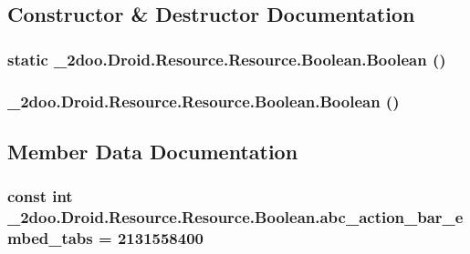 \subsection{Constructor \& Destructor Documentation}
\hypertarget{class__2doo_1_1_droid_1_1_resource_1_1_boolean_59a19de72da5a1089debe4876b3eefd8}{
\subsubsection[{Boolean}]{\setlength{\rightskip}{0pt plus 5cm}static \_\-2doo.Droid.Resource.Resource.Boolean.Boolean ()}}
\label{class__2doo_1_1_droid_1_1_resource_1_1_boolean_59a19de72da5a1089debe4876b3eefd8}


\hypertarget{class__2doo_1_1_droid_1_1_resource_1_1_boolean_e0da100fe4ae8712ba0b896a50a0fae5}{
\subsubsection[{Boolean}]{\setlength{\rightskip}{0pt plus 5cm}\_\-2doo.Droid.Resource.Resource.Boolean.Boolean ()}}
\label{class__2doo_1_1_droid_1_1_resource_1_1_boolean_e0da100fe4ae8712ba0b896a50a0fae5}




\subsection{Member Data Documentation}
\hypertarget{class__2doo_1_1_droid_1_1_resource_1_1_boolean_1778f92eb088c1e2a251c8135cc48d24}{
\subsubsection[{abc\_\-action\_\-bar\_\-embed\_\-tabs}]{\setlength{\rightskip}{0pt plus 5cm}const int \_\-2doo.Droid.Resource.Resource.Boolean.abc\_\-action\_\-bar\_\-embed\_\-tabs = 2131558400}}
\label{class__2doo_1_1_droid_1_1_resource_1_1_boolean_1778f92eb088c1e2a251c8135cc48d24}


